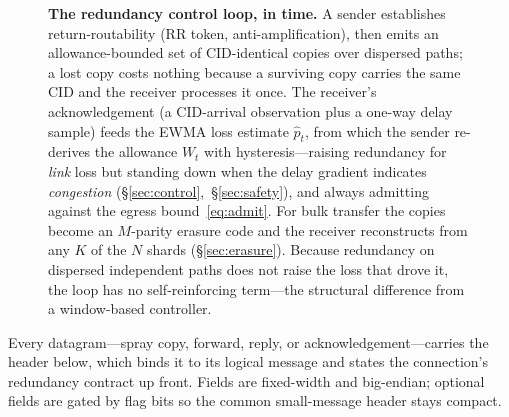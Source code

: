 \documentclass[10pt,twocolumn]{article}
\begin{document}
\begin{figure}[t]
\caption{\textbf{The redundancy control loop, in time.} A sender establishes
return-routability (RR token, anti-amplification), then emits an
allowance-bounded set of CID-identical copies over dispersed paths; a lost copy
costs nothing because a surviving copy carries the same CID and the receiver
processes it once. The receiver's acknowledgement (a CID-arrival observation plus
a one-way delay sample) feeds the EWMA loss estimate $\hat p_t$, from which the
sender re-derives the allowance $W_t$ with hysteresis---raising redundancy for
\emph{link} loss but standing down when the delay gradient indicates
\emph{congestion} (\S\ref{sec:control},~\S\ref{sec:safety}), and always admitting
against the egress bound~\eqref{eq:admit}. For bulk transfer the copies become an
$M$-parity erasure code and the receiver reconstructs from any $K$ of the $N$
shards (\S\ref{sec:erasure}). Because redundancy on dispersed independent paths
does not raise the loss that drove it, the loop has no self-reinforcing term---the
structural difference from a window-based controller.}
\label{fig:controlloop}
\end{figure}
Every datagram---spray copy, forward, reply, or acknowledgement---carries the
header below, which binds it to its logical message and states the connection's
redundancy contract up front. Fields are fixed-width and big-endian; optional
fields are gated by flag bits so the common small-message header stays compact.
\end{document}
